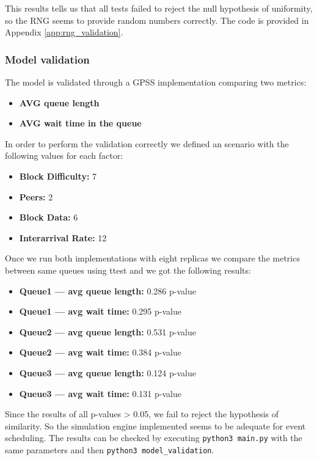\documentclass[12pt,a4paper]{article}
\begin{document}
	\noindent This results tells us that all tests failed to reject the null hypothesis of uniformity, so the RNG seems to provide random numbers correctly. The code is provided in Appendix \ref{app:rng_validation}.
	
	\subsubsection*{Model validation}
	
	The model is validated through a GPSS implementation comparing two metrics:
	
	\begin{itemize}
		\item \textbf{AVG queue length}
		\item \textbf{AVG wait time in the queue} 
	\end{itemize}
	
	\noindent In order to perform the validation correctly we defined an scenario with the following values for each factor:
	
	\begin{itemize}
		\item \textbf{Block Difficulty:} 7
		\item \textbf{Peers:} 2
		\item \textbf{Block Data:} 6
		\item \textbf{Interarrival Rate:} 12
	\end{itemize}
	
	\noindent Once we run both implementations with eight replicas we compare the metrics between same queues using ttest and we got the following results:
	
	\begin{itemize}
		\item \textbf{Queue1 --- avg queue length:} 0.286 p-value
		\item \textbf{Queue1 --- avg wait time:} 0.295 p-value
		\item \textbf{Queue2 --- avg queue length:} 0.531 p-value
		\item \textbf{Queue2 --- avg wait time:} 0.384 p-value
		\item \textbf{Queue3 --- avg queue length:} 0.124 p-value
		\item \textbf{Queue3 --- avg wait time:} 0.131 p-value
	\end{itemize}
	
	\noindent Since the results of all p-values > 0.05, we fail to reject the hypothesis of similarity. So the simulation engine implemented seems to be adequate for event scheduling. The results can be checked by executing \texttt{python3 main.py} with the same parameters and then \texttt{python3 model\_validation}.
\end{document}
